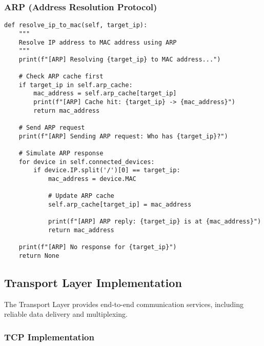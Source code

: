 \documentclass[12pt,a4paper]{article}
\begin{document}
\subsubsection{ARP (Address Resolution Protocol)}

\begin{lstlisting}[caption=ARP Implementation]
def resolve_ip_to_mac(self, target_ip):
    """
    Resolve IP address to MAC address using ARP
    """
    print(f"[ARP] Resolving {target_ip} to MAC address...")
    
    # Check ARP cache first
    if target_ip in self.arp_cache:
        mac_address = self.arp_cache[target_ip]
        print(f"[ARP] Cache hit: {target_ip} -> {mac_address}")
        return mac_address
    
    # Send ARP request
    print(f"[ARP] Sending ARP request: Who has {target_ip}?")
    
    # Simulate ARP response
    for device in self.connected_devices:
        if device.IP.split('/')[0] == target_ip:
            mac_address = device.MAC
            
            # Update ARP cache
            self.arp_cache[target_ip] = mac_address
            
            print(f"[ARP] ARP reply: {target_ip} is at {mac_address}")
            return mac_address
    
    print(f"[ARP] No response for {target_ip}")
    return None
\end{lstlisting}

\subsection{Transport Layer Implementation}

The Transport Layer provides end-to-end communication services, including reliable data delivery and multiplexing.

\subsubsection{TCP Implementation}
\end{document}
